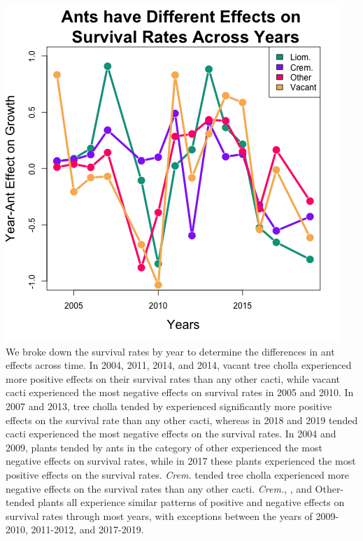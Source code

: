 \documentclass[12pt,a4paper]{article}
\begin{document}
{{\includegraphics{"Figures/surv_year_ant_timeseries.png"}
We broke down the survival rates by year to determine the differences in ant effects across time. 
In 2004, 2011, 2014, and 2014, vacant tree cholla experienced more positive effects on their survival rates than any other cacti, while vacant cacti experienced the most negative effects on survival rates in 2005 and 2010.
In 2007 and 2013, tree cholla tended by  experienced significantly more positive effects on the survival rate than any other cacti, whereas in 2018 and 2019  tended cacti experienced the most negative effects on the survival rates. 
In 2004 and 2009, plants tended by ants in the category of other experienced the most negative effects on survival rates, while in 2017 these plants experienced the most positive effects on the survival rates. 
\textit{Crem.} tended tree cholla experienced more negative effects on the survival rates than any other cacti. 
\textit{Crem.}, , and Other-tended plants all experience similar patterns of positive and negative effects on survival rates through most years, with exceptions between the years of 2009-2010, 2011-2012, and 2017-2019. 

}}
\end{document}
